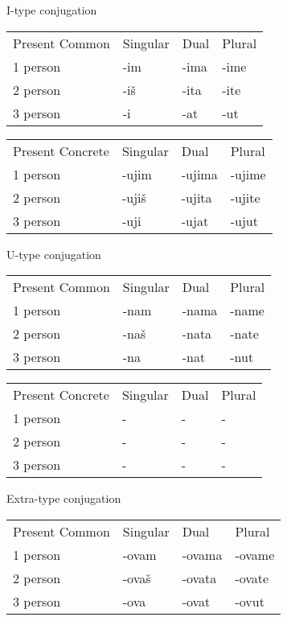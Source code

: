 I-type conjugation

\begin{table}[h]
	\begin{tabular}{llll}
		Present Common & Singular & Dual & Plural \\
		1 person & -im & -ima & -ime \\
		2 person & -iš & -ita & -ite \\
		3 person & -i & -at & -ut
	\end{tabular}
\end{table}


\begin{table}[h]
	\begin{tabular}{llll}
		Present Concrete & Singular & Dual & Plural \\
		1 person & -ujim & -ujima & -ujime \\
		2 person & -ujiš & -ujita & -ujite \\
		3 person & -uji & -ujat & -ujut
	\end{tabular}
\end{table}

U-type conjugation

\begin{table}[h]
	\begin{tabular}{llll}
		Present Common & Singular & Dual & Plural \\
		1 person & -nam & -nama & -name \\
		2 person & -naš & -nata & -nate \\
		3 person & -na & -nat & -nut
	\end{tabular}
\end{table}


\begin{table}[h]
	\begin{tabular}{llll}
		Present Concrete & Singular & Dual & Plural \\
		1 person & - & - & - \\
		2 person & - & - & - \\
		3 person & - & - & -
	\end{tabular}
\end{table}

Extra-type conjugation

\begin{table}[h]
	\begin{tabular}{llll}
		Present Common & Singular & Dual & Plural \\
		1 person & -ovam & -ovama & -ovame \\
		2 person & -ovaš & -ovata & -ovate \\
		3 person & -ova & -ovat & -ovut
	\end{tabular}
\end{table}


